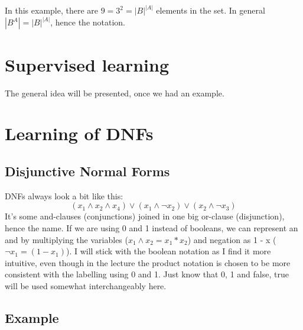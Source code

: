 \documentclass{article}
\begin{document}
In this example, there are $9 = 3^2 = |B|^{|A|}$ elements in the set.
In general $ |B^A| = |B|^{|A|}$, hence the notation.

\newpage


\section{Supervised learning}
The general idea will be presented, once we had an example.

\section{Learning of DNFs}

\subsection{Disjunctive Normal Forms}

DNFs always look a bit like this:
\begin{equation*}
    (x_1 \land x_2 \land x_4) \lor (x_1 \land \lnot x_2) \lor (x_2 \land \lnot x_3)
\end{equation*}
It's some and-clauses (conjunctions) joined in one big or-clause (disjunction), hence the name. If we are using 0 and 1 instead of booleans, we can represent an and by multiplying the variables ($x_1 \land x_2 = x_1 * x_2$) and negation as 1 - x ($\lnot x_1 = (1 - x_1)$). I will stick with the boolean notation as I find it more intuitive, even though in the lecture the product notation is chosen to be more consistent with the labelling using 0 and 1. Just know that {0, 1} and {false, true} will be used somewhat interchangeably here.

\subsection{Example}
\end{document}
